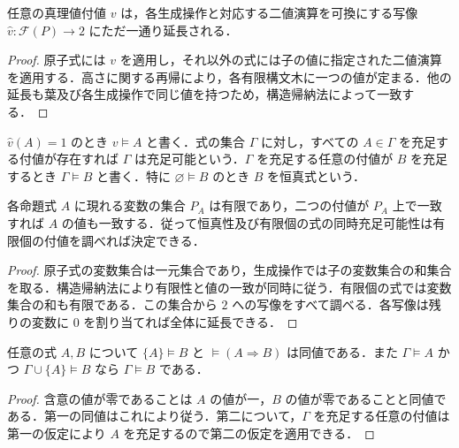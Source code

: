 \begin{prop}[真理値付値の延長]
任意の真理値付値 $v$ は，各生成操作と対応する二値演算を可換にする写像 $\widehat v:\mathcal F(P)\to2$ にただ一通り延長される．
\end{prop}
\begin{proof}
原子式には $v$ を適用し，それ以外の式には子の値に指定された二値演算を適用する．高さに関する再帰により，各有限構文木に一つの値が定まる．他の延長も葉及び各生成操作で同じ値を持つため，構造帰納法によって一致する．
\end{proof}
\begin{defn}[充足と意味論的帰結]
$\widehat v(A)=1$ のとき $v\models A$ と書く．式の集合 $\Gamma$ に対し，すべての $A\in\Gamma$ を充足する付値が存在すれば $\Gamma$ は充足可能という．$\Gamma$ を充足する任意の付値が $B$ を充足するとき $\Gamma\models B$ と書く．特に $\varnothing\models B$ のとき $B$ を恒真式という．
\end{defn}
\begin{prop}[有限個の変数による真理値の決定]
各命題式 $A$ に現れる変数の集合 $P_A$ は有限であり，二つの付値が $P_A$ 上で一致すれば $A$ の値も一致する．従って恒真性及び有限個の式の同時充足可能性は有限個の付値を調べれば決定できる．
\end{prop}
\begin{proof}
原子式の変数集合は一元集合であり，生成操作では子の変数集合の和集合を取る．構造帰納法により有限性と値の一致が同時に従う．有限個の式では変数集合の和も有限である．この集合から $2$ への写像をすべて調べる．各写像は残りの変数に $0$ を割り当てれば全体に延長できる．
\end{proof}
\begin{prop}[含意と意味論的帰結]
任意の式 $A,B$ について $\{A\}\models B$ と $\models(A\Rightarrow B)$ は同値である．また $\Gamma\models A$ かつ $\Gamma\cup\{A\}\models B$ なら $\Gamma\models B$ である．
\end{prop}
\begin{proof}
含意の値が零であることは $A$ の値が一，$B$ の値が零であることと同値である．第一の同値はこれにより従う．第二について，$\Gamma$ を充足する任意の付値は第一の仮定により $A$ を充足するので第二の仮定を適用できる．
\end{proof}
